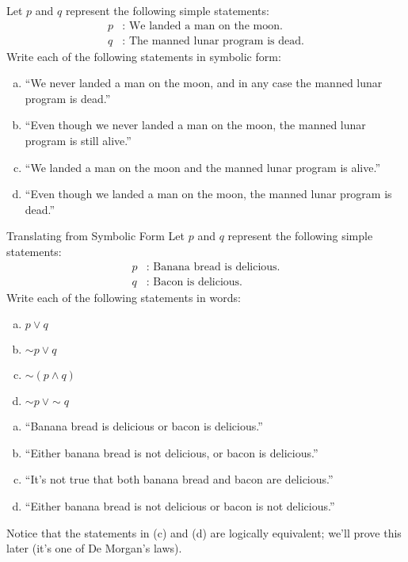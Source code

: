 \begin{try}
Let $p$ and $q$ represent the following simple statements:
\begin{align*}
p &: \textrm{ We landed a man on the moon.}\\
q &: \textrm{ The manned lunar program is dead.}
\end{align*}
Write each of the following statements in symbolic form:

\begin{enumerate}[(a)]
\item ``We never landed a man on the moon, and in any case the manned lunar program is dead.''
\item ``Even though we never landed a man on the moon, the manned lunar program is still alive.''
\item ``We landed a man on the moon and the manned lunar program is alive.''
\item ``Even though we landed a man on the moon, the manned lunar program is dead.''
\end{enumerate}
\end{try}

\begin{example}[https://www.youtube.com/watch?v=GZDdj5PjVXY]{Translating from Symbolic Form}
Let $p$ and $q$ represent the following simple statements:
\begin{align*}
p &: \textrm{ Banana bread is delicious.}\\
q &: \textrm{ Bacon is delicious.}
\end{align*}
Write each of the following statements in words:
\begin{enumerate}[(a)]
\item $p \vee q$
\item $\sim p \vee q$
\item $\sim (p \wedge q)$
\item $\sim p\ \vee \sim q$
\end{enumerate}

\sol
\begin{enumerate}[(a)]
\item ``Banana bread is delicious or bacon is delicious.''
\item ``Either banana bread is not delicious, or bacon is delicious.''
\item ``It's not true that both banana bread and bacon are delicious.''
\item ``Either banana bread is not delicious or bacon is not delicious.''
\end{enumerate}

Notice that the statements in (c) and (d) are logically equivalent; we'll prove this later (it's one of De Morgan's laws).
\end{example}


